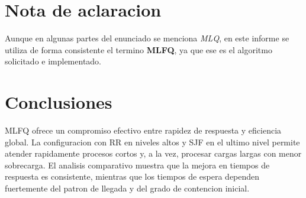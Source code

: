 \documentclass[12pt,a4paper]{article}
\begin{document}
\section{Nota de aclaracion}

Aunque en algunas partes del enunciado se menciona \textit{MLQ}, en este informe se utiliza de forma consistente el termino \textbf{MLFQ}, ya que ese es el algoritmo solicitado e implementado.

\section{Conclusiones}

MLFQ ofrece un compromiso efectivo entre rapidez de respuesta y eficiencia global. La configuracion con RR en niveles altos y SJF en el ultimo nivel permite atender rapidamente procesos cortos y, a la vez, procesar cargas largas con menor sobrecarga. El analisis comparativo muestra que la mejora en tiempos de respuesta es consistente, mientras que los tiempos de espera dependen fuertemente del patron de llegada y del grado de contencion inicial.
\end{document}
